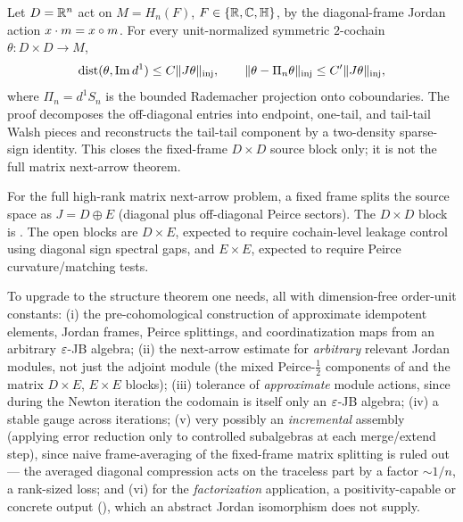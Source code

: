 \begin{proposition}\label{prop:diag-next-arrow}
Let $D=\mathbb{R}^n$ act on $M=H_n(F)$, $F\in\{\mathbb{R},\mathbb{C},\mathbb H\}$, by the diagonal-frame
Jordan action $x\cdot m=x\circ m$. For every unit-normalized symmetric
$2$-cochain $\theta\colon D\times D\to M$,
\[
  \operatorname{dist}(\theta,\operatorname{Im} d^1)\le C\lVert J\theta \rVert_{\mathrm{inj}},
  \qquad
  \lVert \theta-\Pi_n\theta \rVert_{\mathrm{inj}}\le C'\lVert J\theta \rVert_{\mathrm{inj}},
\]
where $\Pi_n=d^1S_n$ is the bounded Rademacher projection onto coboundaries.
The proof decomposes the off-diagonal entries into endpoint, one-tail, and
tail-tail Walsh pieces and reconstructs the tail-tail component by a two-density
sparse-sign identity. This closes the fixed-frame $D\times D$ source block only;
it is not the full matrix next-arrow theorem.
\end{proposition}

For the full high-rank matrix next-arrow problem, a fixed frame splits the source
space as $J=D\oplus E$ (diagonal plus off-diagonal Peirce sectors). The
$D\times D$ block is . The open blocks are
$D\times E$, expected to require cochain-level leakage control using diagonal
sign spectral gaps, and $E\times E$, expected to require Peirce
curvature/matching tests.

\begin{openproblem}
\label{op:layer1-gap}
To upgrade  to the structure theorem one needs, all
with dimension-free order-unit constants: (i) the pre-cohomological construction
of approximate idempotent elements, Jordan frames, Peirce splittings, and
coordinatization maps from an arbitrary $\varepsilon$-JB algebra; (ii) the next-arrow
estimate for \emph{arbitrary} relevant Jordan modules, not just the adjoint
module (the mixed Peirce-$\tfrac12$ components of  and
the matrix $D\times E$, $E\times E$ blocks); (iii) tolerance of
\emph{approximate} module actions, since during the Newton iteration the
codomain is itself only an $\varepsilon$-JB algebra; (iv) a stable gauge across
iterations; (v) very possibly an \emph{incremental} assembly (applying error
reduction only to controlled subalgebras at each merge/extend step), since naive
frame-averaging of the fixed-frame matrix splitting is ruled out --- the
averaged diagonal compression acts on the traceless part by a factor $\sim1/n$,
a rank-sized loss; and (vi) for the \emph{factorization} application, a
positivity-capable or concrete output (), which an
abstract Jordan isomorphism does not supply.
\end{openproblem}

